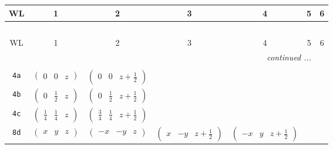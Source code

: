 \documentclass[fleqn,9pt,landscape]{jsarticle}
\begin{document}
\begin{center}
\renewcommand{\arraystretch}{1.2}
\begin{longtable}{ccccccc}
 \hline \hline
WL & 1 & 2 & 3 & 4 & 5 & 6 \\ \hline \endfirsthead

\multicolumn{6}{l}{\tablename\ \thetable{}} \\
 \hline \hline
WL & 1 & 2 & 3 & 4 & 5 & 6 \\ \hline \endhead

 \hline \hline
\multicolumn{6}{r}{\footnotesize\it continued ...} \\ \endfoot

 \hline \hline
\multicolumn{6}{r}{} \\ \endlastfoot

{\tt 4a} & $ \begin{pmatrix} 0 & 0 & z \end{pmatrix} $ & $ \begin{pmatrix} 0 & 0 & z + \frac{1}{2} \end{pmatrix} $ & $  $ & $  $ \\ \hline
{\tt 4b} & $ \begin{pmatrix} 0 & \frac{1}{2} & z \end{pmatrix} $ & $ \begin{pmatrix} 0 & \frac{1}{2} & z + \frac{1}{2} \end{pmatrix} $ & $  $ & $  $ \\ \hline
{\tt 4c} & $ \begin{pmatrix} \frac{1}{4} & \frac{1}{4} & z \end{pmatrix} $ & $ \begin{pmatrix} \frac{3}{4} & \frac{1}{4} & z + \frac{1}{2} \end{pmatrix} $ & $  $ & $  $ \\ \hline
{\tt 8d} & $ \begin{pmatrix} x & y & z \end{pmatrix} $ & $ \begin{pmatrix} - x & - y & z \end{pmatrix} $ & $ \begin{pmatrix} x & - y & z + \frac{1}{2} \end{pmatrix} $ & $ \begin{pmatrix} - x & y & z + \frac{1}{2} \end{pmatrix} $ \\
\end{longtable}
\end{center}
\end{document}
